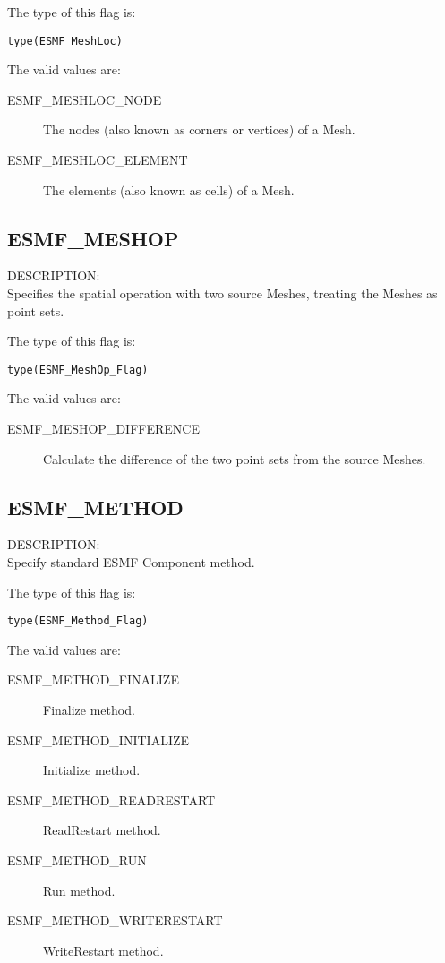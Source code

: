The type of this flag is:

{\tt type(ESMF\_MeshLoc)}

The valid values are:
\begin{description}

\item [ESMF\_MESHLOC\_NODE]
         The nodes (also known as corners or vertices) of a Mesh. 

\item [ESMF\_MESHLOC\_ELEMENT]
         The elements (also known as cells) of a Mesh. 
\end{description}


\subsection{ESMF\_MESHOP}
\label{const:meshop}
{\sf DESCRIPTION:\\}  
 Specifies the spatial operation with two source Meshes, treating the Meshes as point sets.

The type of this flag is:

{\tt type(ESMF\_MeshOp\_Flag)}

The valid values are:
\begin{description}

\item [ESMF\_MESHOP\_DIFFERENCE]
         Calculate the difference of the two point sets from the source Meshes.
\end{description}

\subsection{ESMF\_METHOD}
\label{const:method}

{\sf DESCRIPTION:\\}  
Specify standard ESMF Component method.

The type of this flag is:

{\tt type(ESMF\_Method\_Flag)}

The valid values are:
\begin{description}
\item [ESMF\_METHOD\_FINALIZE]
      Finalize method.
\item [ESMF\_METHOD\_INITIALIZE]
      Initialize method.
\item [ESMF\_METHOD\_READRESTART]
      ReadRestart method.
\item [ESMF\_METHOD\_RUN]
      Run method.
\item [ESMF\_METHOD\_WRITERESTART]
      WriteRestart method.
\end{description}



